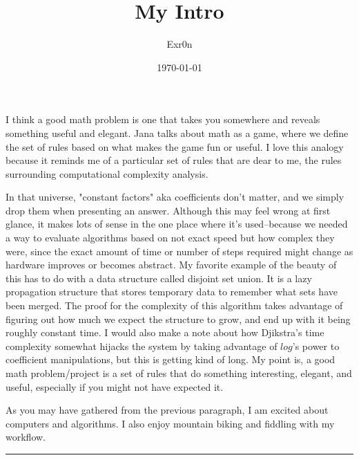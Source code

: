 \documentclass[letterpaper]{article}
\author{Exr0n}
\date{\today}
\title{My Intro}
\renewcommand\maketitle{}
\begin{document}
\maketitle
I think a good math problem is one that takes you somewhere and reveals
something useful and elegant. Jana talks about math as a game, where we
define the set of rules based on what makes the game fun or useful. I
love this analogy because it reminds me of a particular set of rules
that are dear to me, the rules surrounding computational complexity
analysis.

In that universe, "constant factors" aka coefficients don't matter, and
we simply drop them when presenting an answer. Although this may feel
wrong at first glance, it makes lots of sense in the one place where
it's used--because we needed a way to evaluate algorithms based on not
exact speed but how complex they were, since the exact amount of time or
number of steps required might change as hardware improves or becomes
abstract. My favorite example of the beauty of this has to do with a
data structure called disjoint set union. It is a lazy propagation
structure that stores temporary data to remember what sets have been
merged. The proof for the complexity of this algorithm takes advantage
of figuring out how much we expect the structure to grow, and end up
with it being roughly constant time. I would also make a note about how
Djikstra's time complexity somewhat hijacks the system by taking
advantage of \(log\)'s power to coefficient manipulations, but this is
getting kind of long. My point is, a good math problem/project is a set
of rules that do something interesting, elegant, and useful, especially
if you might not have expected it.

As you may have gathered from the previous paragraph, I am excited about
computers and algorithms. I also enjoy mountain biking and fiddling with
my workflow.

\noindent\rule{\textwidth}{0.5pt}
\end{document}
